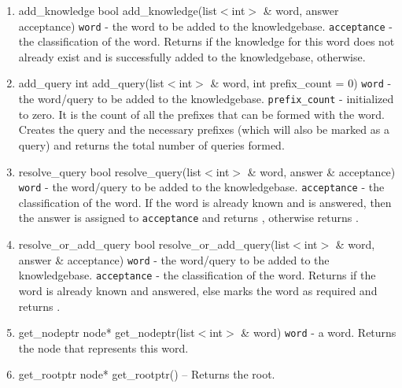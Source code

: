 \begin{enumerate}
\begin{detail}
\end{detail}
\item \begin{detail}
{add\_knowledge}
{bool add\_knowledge(list$<$int$>$ \& word, answer acceptance)}
{\texttt{word} - the word to be added to the knowledgebase.
 \texttt{acceptance} - the classification of the word.}
{Returns \true if the knowledge for this word does not already exist and is successfully added to the knowledgebase, \false otherwise.} 
\end{detail}
\item \begin{detail}
{add\_query}
{int add\_query(list$<$int$>$ \& word, int prefix\_count = 0)}
{\texttt{word} - the word/query to be added to the knowledgebase.
 \texttt{prefix\_count} - initialized to zero. It is the count of all the prefixes that can be formed with the word.}
{Creates the query and the necessary prefixes (which will also be marked as a query) and returns the total number of queries formed.} 
\end{detail}
\item \begin{detail}
{resolve\_query}
{bool resolve\_query(list$<$int$>$ \& word, answer \& acceptance)}
{\texttt{word} - the word/query to be added to the knowledgebase.
 \texttt{acceptance} - the classification of the word.}
{If the word is already known and is answered, then the answer is assigned to \texttt{acceptance} and returns \true, otherwise returns \false.} 
\end{detail}
\item \begin{detail}
{resolve\_or\_add\_query}
{bool resolve\_or\_add\_query(list$<$int$>$ \& word, answer \& acceptance)}
{\texttt{word} - the word/query to be added to the knowledgebase.
 \texttt{acceptance} - the classification of the word.}
{Returns \true if the word is already known and answered, else marks the word as required and returns \false.} 
\end{detail}
\item \begin{detail}
{get\_nodeptr}
{node* get\_nodeptr(list$<$int$>$ \& word)}
{\texttt{word} - a word.}
{Returns the node that represents this word.} 
\end{detail}
\item \begin{detail}
{get\_rootptr}
{node* get\_rootptr()}
{--}
{Returns the root.} 
\end{detail}

\end{enumerate}
